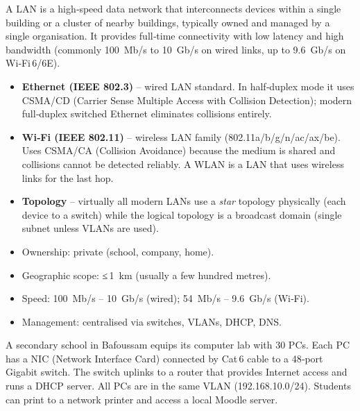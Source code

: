 \documentclass[11pt]{article}
\begin{document}
\begin{definition}
A LAN is a high‑speed data network that interconnects devices within a single building or a cluster of nearby buildings, typically owned and managed by a single organisation. It provides full‑time connectivity with low latency and high bandwidth (commonly \SI{100}{Mb/s} to \SI{10}{Gb/s} on wired links, up to \SI{9.6}{Gb/s} on Wi‑Fi 6/6E).
\end{definition}

\begin{propriete}
\begin{itemize}
\item \textbf{Ethernet (IEEE 802.3)} – wired LAN standard. In half‑duplex mode it uses CSMA/CD (Carrier Sense Multiple Access with Collision Detection); modern full‑duplex switched Ethernet eliminates collisions entirely.
\item \textbf{Wi‑Fi (IEEE 802.11)} – wireless LAN family (802.11a/b/g/n/ac/ax/be). Uses CSMA/CA (Collision Avoidance) because the medium is shared and collisions cannot be detected reliably. A WLAN is a LAN that uses wireless links for the last hop.
\item \textbf{Topology} – virtually all modern LANs use a \emph{star} topology physically (each device to a switch) while the logical topology is a broadcast domain (single subnet unless VLANs are used).
\end{itemize}
\end{propriete}

\begin{aretenir}
\begin{itemize}
\item Ownership: private (school, company, home).
\item Geographic scope: ≤ \SI{1}{km} (usually a few hundred metres).
\item Speed: \SI{100}{Mb/s} – \SI{10}{Gb/s} (wired); \SI{54}{Mb/s} – \SI{9.6}{Gb/s} (Wi‑Fi).
\item Management: centralised via switches, VLANs, DHCP, DNS.
\end{itemize}
\end{aretenir}

\begin{exemplebox}
A secondary school in Bafoussam equips its computer lab with 30 PCs. Each PC has a NIC (Network Interface Card) connected by Cat 6 cable to a 48‑port Gigabit switch. The switch uplinks to a router that provides Internet access and runs a DHCP server. All PCs are in the same VLAN (192.168.10.0/24). Students can print to a network printer and access a local Moodle server.
\end{exemplebox}
\end{document}
